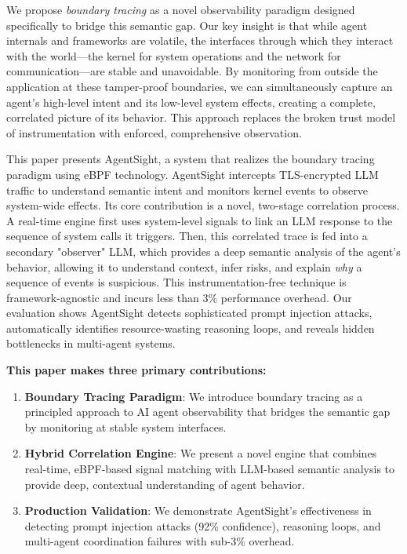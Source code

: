 We propose \emph{boundary tracing} as a novel observability paradigm designed specifically to bridge this semantic gap. Our key insight is that while agent internals and frameworks are volatile, the interfaces through which they interact with the world—the kernel for system operations and the network for communication—are stable and unavoidable. By monitoring from outside the application at these tamper-proof boundaries, we can simultaneously capture an agent's high-level intent and its low-level system effects, creating a complete, correlated picture of its behavior. This approach replaces the broken trust model of instrumentation with enforced, comprehensive observation.

This paper presents AgentSight, a system that realizes the boundary tracing paradigm using eBPF technology. AgentSight intercepts TLS-encrypted LLM traffic to understand semantic intent and monitors kernel events to observe system-wide effects. Its core contribution is a novel, two-stage correlation process. A real-time engine first uses system-level signals to link an LLM response to the sequence of system calls it triggers. Then, this correlated trace is fed into a secondary "observer" LLM, which provides a deep semantic analysis of the agent's behavior, allowing it to understand context, infer risks, and explain \emph{why} a sequence of events is suspicious. This instrumentation-free technique is framework-agnostic and incurs less than 3\% performance overhead. Our evaluation shows AgentSight detects sophisticated prompt injection attacks, automatically identifies resource-wasting reasoning loops, and reveals hidden bottlenecks in multi-agent systems.

\textbf{This paper makes three primary contributions:}

\begin{enumerate}
\item \textbf{Boundary Tracing Paradigm}: We introduce boundary tracing as a principled approach to AI agent observability that bridges the semantic gap by monitoring at stable system interfaces.

\item \textbf{Hybrid Correlation Engine}: We present a novel engine that combines real-time, eBPF-based signal matching with LLM-based semantic analysis to provide deep, contextual understanding of agent behavior.

\item \textbf{Production Validation}: We demonstrate AgentSight's effectiveness in detecting prompt injection attacks (92\% confidence), reasoning loops, and multi-agent coordination failures with sub-3\% overhead.
\end{enumerate}